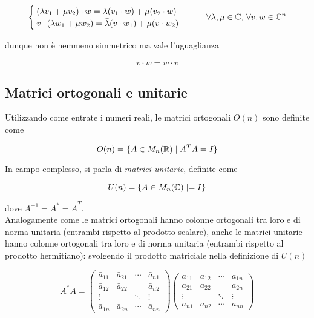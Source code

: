 \begin{equation}
	\begin{cases}
		(\lambda v_{1} + \mu v_{2}) \cdot w = \lambda (v_{1} \cdot w) + \mu (v_{2} \cdot w)\\
		v \cdot (\lambda w_{1} + \mu w_{2}) = \bar{\lambda} (v \cdot w_{1}) + \bar{\mu} (v \cdot w_{2})
	\end{cases}%
	\qquad \forall \lambda,\mu \in \C, \, \forall v,w \in \C^{n}
\end{equation}

dunque non è nemmeno simmetrico ma vale l'uguaglianza

\begin{equation}
	v \cdot w = \overline{w \cdot v}
\end{equation}

\subsection{Matrici ortogonali e unitarie}

Utilizzando come entrate i numeri reali, le matrici ortogonali $ O(n) $ sono definite come

\begin{equation}
	O(n) = \{ A \in M_{n}(\mathbb{R}) \mid A^{T} A = I \}
\end{equation}

In campo complesso, si parla di \textit{matrici unitarie}, definite come

\begin{equation}
	U(n) = \{ A \in M_{n}(\mathbb{C}) \mid  = I \}
\end{equation}

dove $ A ^{-1} = A^{*} = \bar{A}^{T} $.\\
Analogamente come le matrici ortogonali hanno colonne ortogonali tra loro e di norma unitaria (entrambi rispetto al prodotto scalare), anche le matrici unitarie hanno colonne ortogonali tra loro e di norma unitaria (entrambi rispetto al prodotto hermitiano): svolgendo il prodotto matriciale nella definizione di $ U(n) $

\begin{equation}
	A^{*} A = %
	\begin{pmatrix}
		\bar{a}_{11} & \bar{a}_{21} & \cdots & \bar{a}_{n1} \\ %
		\bar{a}_{12} & \bar{a}_{22} & & \bar{a}_{n2}\\ %
		\vdots & & \ddots & \vdots \\ %
		\bar{a}_{1n} & \bar{a}_{2n} & \cdots & \bar{a}_{nn}
	\end{pmatrix}%
	\begin{pmatrix}
		a_{11} & a_{12} & \cdots & a_{1n} \\ %
		a_{21} & a_{22} & & a_{2n}\\ %
		\vdots & & \ddots & \vdots \\ %
		a_{n1} & a_{n2} & \cdots & a_{nn}
	\end{pmatrix}
\end{equation}


